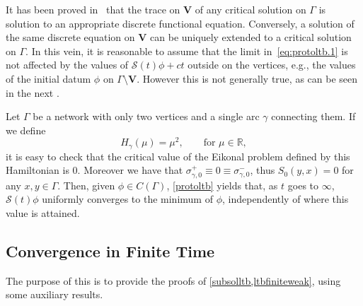 \documentclass[11pt,a4paper,american]{article}
\newcommand{\Rds}{\mathds R}
\newcommand{\Scal}{\mathcal S}
\newcommand{\Vbf}{\mathbf V}
\begin{document}
    It has been proved in~\cite{SiconolfiSorrentino18} that the trace on $\Vbf$ of any critical solution on $\Gamma$ is solution to an appropriate discrete functional equation. Conversely, a solution of the same discrete equation on $\Vbf$ can be uniquely extended to a critical solution on $\Gamma$. In this vein, it is reasonable to assume that the limit in~\cref{eq:protoltb.1} is not affected by the values of $\Scal(t)\phi+ct$ outside on the vertices, e.g., the values of the initial datum $\phi$ on $\Gamma\setminus\Vbf$. However this is not generally true, as can be seen in the next .

    \begin{ex}\label{asympnofocusV}
        Let $\Gamma$ be a network with only two vertices and a single arc $\gamma$ connecting them. If we define
        \begin{equation*}
            H_\gamma(\mu)=\mu^2,\qquad\text{for }\mu\in\Rds,
        \end{equation*}
        it is easy to check that the critical value of the Eikonal problem defined by this Hamiltonian is 0. Moreover we have that $\sigma_{\gamma,0}^+\equiv0\equiv\sigma_{\gamma,0}^-$, thus $S_0(y,x)=0$ for any $x,y\in\Gamma$. Then, given $\phi\in C(\Gamma)$, \cref{protoltb} yields that, as $t$ goes to $\infty$, $\Scal(t)\phi$ uniformly converges to the minimum of $\phi$, independently of where this value is attained.
    \end{ex}

    \subsection{Convergence in Finite Time}\label{convfintime}

    The purpose of this  is to provide the proofs of \cref{subsolltb,ltbfiniteweak}, using some auxiliary results.
\end{document}
